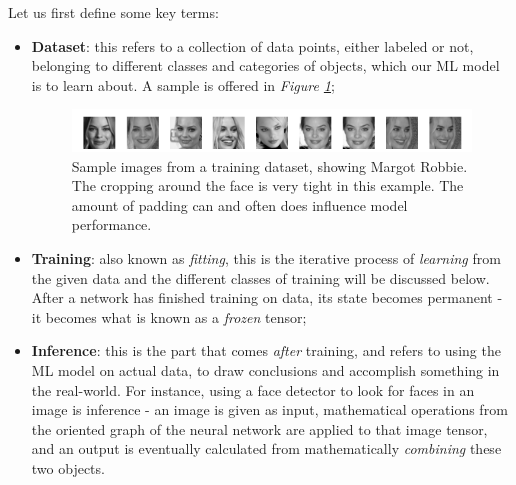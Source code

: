 Let us first define some key terms:
\begin{itemize}
    \item \textbf{Dataset}: this refers to a collection of data points, either labeled or not, belonging to different classes and categories of objects, which our ML model is to learn about. A sample is offered in \textit{Figure \ref{margot_robbie_9}};
    \begin{figure}
        \centering
        \includegraphics{images/margot_robbie_good.png}
        \caption{Sample images from a training dataset, showing Margot Robbie. The cropping around the face is very tight in this example. The amount of padding can and often does influence model performance.}
        \label{margot_robbie_9}
    \end{figure}
    \item \textbf{Training}: also known as \textit{fitting}, this is the iterative process of \textit{learning} from the given data and the different classes of training will be discussed below. After a network has finished training on data, its state becomes permanent - it becomes what is known as a \textit{frozen} tensor;
    \item \textbf{Inference}: this is the part that comes \textit{after} training, and refers to using the ML model on actual data, to draw conclusions and accomplish something in the real-world. For instance, using a face detector to look for faces in an image is inference - an image is given as input, mathematical operations from the oriented graph of the neural network are applied to that image tensor, and an output is eventually calculated from mathematically \textit{combining} these two objects.
\end{itemize}



